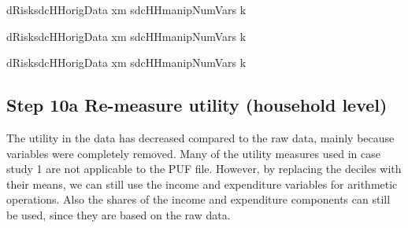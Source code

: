 \documentclass[letterpaper,10pt,english]{sphinxmanual}
\begin{document}
\def\sphinxLiteralBlockLabel{\label{\detokenize{casestudies:code939}}}
%
\begin{sphinxVerbatim}[commandchars=\\\{\},numbers=left,firstnumber=1,stepnumber=1]
dRisksdcHHorigData\PYG{p}{[} \PYG{p}{]}
      xm  sdcHHmanipNumVars\PYG{p}{[} \PYG{p}{]} k  

dRisksdcHHorigData\PYG{p}{[} \PYG{p}{]}
      xm  sdcHHmanipNumVars\PYG{p}{[} \PYG{p}{]} k  

dRisksdcHHorigData\PYG{p}{[} \PYG{p}{]}
      xm  sdcHHmanipNumVars\PYG{p}{[} \PYG{p}{]} k  
\end{sphinxVerbatim}


\subsection{Step 10a Re-measure utility (household level)}
\label{\detokenize{casestudies:step-10a-re-measure-utility-household-level}}
The utility in the data has decreased compared to the raw data, mainly
because variables were completely removed. Many of the utility measures
used in case study 1 are not applicable to the PUF file. However, by
replacing the deciles with their means, we can still use the income and
expenditure variables for arithmetic operations. Also the shares of the
income and expenditure components can still be used, since they are
based on the raw data.
\end{document}
